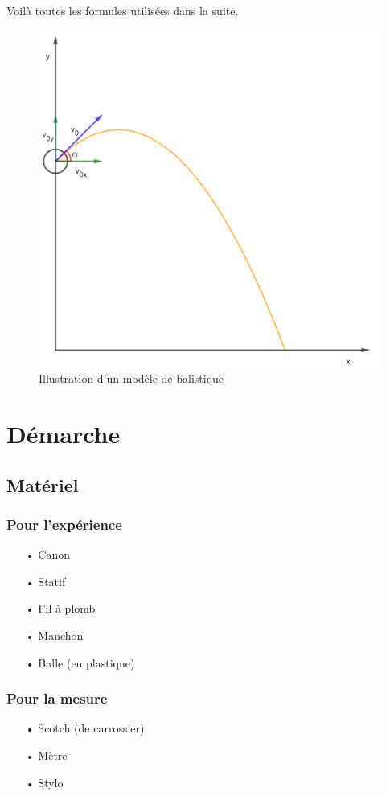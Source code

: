 \documentclass[11pt]{article}
\begin{document}
Voilà toutes les formules utilisées dans la suite. 
\begin{figure}[H]
\centering
\includegraphics[scale=1.3]{geogebra-export.png}
\caption{Illustration d'un modèle de balistique}
\end{figure}
\clearpage

\section{Démarche}
\subsection{Matériel}
\subsubsection*{Pour l'expérience}
\begin{itemize}
\item[•] Canon
\item[•] Statif
\item[•] Fil à plomb
\item[•] Manchon
\item[•] Balle (en plastique)
\end{itemize} 

\subsubsection*{Pour la mesure}
\begin{itemize}
\item[•] Scotch (de carrossier)
\item[•] Mètre
\item[•] Stylo
\end{itemize}
\end{document}
